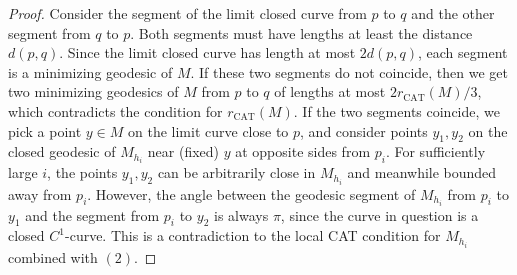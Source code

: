 \documentclass[11pt,letterpaper]{amsart}
\numberwithin{equation}{section}
\theoremstyle{definition}
\theoremstyle{plain}
\theoremstyle{definition}
\theoremstyle{plain}
\theoremstyle{definition}
\theoremstyle{plain}
\begin{document}
\begin{proof}
Consider the segment of the limit closed curve from $p$ to $q$ and the other segment from $q$ to $p$. Both segments must have lengths at least the distance $d(p,q)$. Since the limit closed curve has length at most $2d(p,q)$, each segment is a minimizing geodesic of $M$. If these two segments do not coincide, then we get two minimizing geodesics of $M$ from $p$ to $q$ of lengths at most $2r_{\textrm{CAT}}(M)/3$, which contradicts the condition for $r_{\textrm{CAT}}(M)$. If the two segments coincide, we pick a point $y\in M$ on the limit curve close to $p$, and consider points $y_1,y_2$ on the closed geodesic of $M_{h_i}$ near (fixed) $y$ at opposite sides from $p_i$. For sufficiently large $i$, the points $y_1,y_2$ can be arbitrarily close in $M_{h_i}$ and meanwhile bounded away from $p_i$. However, the angle between the geodesic segment of $M_{h_i}$ from $p_i$ to $y_1$ and the segment from $p_i$ to $y_2$ is always $\pi$, since the curve in question is a closed $C^1$-curve. This is a contradiction to the local CAT condition for $M_{h_i}$ combined with $(2)$.
\end{proof}
\end{document}
